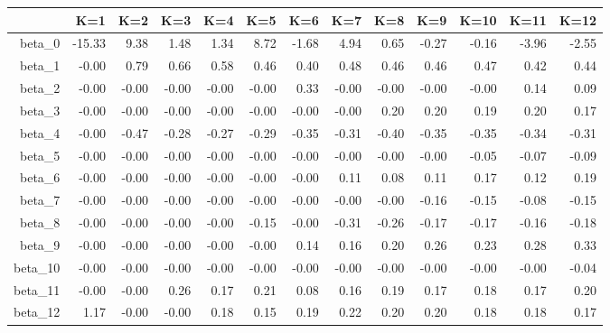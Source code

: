 \begin{table}[ht]
\centering
\begin{tabular}{rrrrrrrrrrrrr}
  \hline
 & K=1 & K=2 & K=3 & K=4 & K=5 & K=6 & K=7 & K=8 & K=9 & K=10 & K=11 & K=12 \\ 
  \hline
beta\_0 & -15.33 & 9.38 & 1.48 & 1.34 & 8.72 & -1.68 & 4.94 & 0.65 & -0.27 & -0.16 & -3.96 & -2.55 \\ 
  beta\_1 & -0.00 & 0.79 & 0.66 & 0.58 & 0.46 & 0.40 & 0.48 & 0.46 & 0.46 & 0.47 & 0.42 & 0.44 \\ 
  beta\_2 & -0.00 & -0.00 & -0.00 & -0.00 & -0.00 & 0.33 & -0.00 & -0.00 & -0.00 & -0.00 & 0.14 & 0.09 \\ 
  beta\_3 & -0.00 & -0.00 & -0.00 & -0.00 & -0.00 & -0.00 & -0.00 & 0.20 & 0.20 & 0.19 & 0.20 & 0.17 \\ 
  beta\_4 & -0.00 & -0.47 & -0.28 & -0.27 & -0.29 & -0.35 & -0.31 & -0.40 & -0.35 & -0.35 & -0.34 & -0.31 \\ 
  beta\_5 & -0.00 & -0.00 & -0.00 & -0.00 & -0.00 & -0.00 & -0.00 & -0.00 & -0.00 & -0.05 & -0.07 & -0.09 \\ 
  beta\_6 & -0.00 & -0.00 & -0.00 & -0.00 & -0.00 & -0.00 & 0.11 & 0.08 & 0.11 & 0.17 & 0.12 & 0.19 \\ 
  beta\_7 & -0.00 & -0.00 & -0.00 & -0.00 & -0.00 & -0.00 & -0.00 & -0.00 & -0.16 & -0.15 & -0.08 & -0.15 \\ 
  beta\_8 & -0.00 & -0.00 & -0.00 & -0.00 & -0.15 & -0.00 & -0.31 & -0.26 & -0.17 & -0.17 & -0.16 & -0.18 \\ 
  beta\_9 & -0.00 & -0.00 & -0.00 & -0.00 & -0.00 & 0.14 & 0.16 & 0.20 & 0.26 & 0.23 & 0.28 & 0.33 \\ 
  beta\_10 & -0.00 & -0.00 & -0.00 & -0.00 & -0.00 & -0.00 & -0.00 & -0.00 & -0.00 & -0.00 & -0.00 & -0.04 \\ 
  beta\_11 & -0.00 & -0.00 & 0.26 & 0.17 & 0.21 & 0.08 & 0.16 & 0.19 & 0.17 & 0.18 & 0.17 & 0.20 \\ 
  beta\_12 & 1.17 & -0.00 & -0.00 & 0.18 & 0.15 & 0.19 & 0.22 & 0.20 & 0.20 & 0.18 & 0.18 & 0.17 \\ 
   \hline
\end{tabular}
\end{table}
